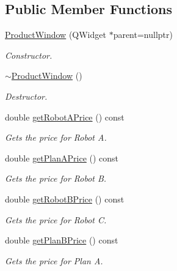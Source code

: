 \subsection*{Public Member Functions}
\begin{DoxyCompactItemize}
\item 
\mbox{\label{class_product_window_adafa731eb2e3c47c30f7a740a3a12576}} 
\mbox{\hyperlink{class_product_window_adafa731eb2e3c47c30f7a740a3a12576}{Product\+Window}} (Q\+Widget $\ast$parent=nullptr)
\begin{DoxyCompactList}\small\item\em Constructor. \end{DoxyCompactList}\item 
\mbox{\label{class_product_window_ae113591d990345573cbcf9faf790a7cc}} 
\mbox{\hyperlink{class_product_window_ae113591d990345573cbcf9faf790a7cc}{$\sim$\+Product\+Window}} ()
\begin{DoxyCompactList}\small\item\em Destructor. \end{DoxyCompactList}\item 
double \mbox{\hyperlink{class_product_window_a2256cbdf9844bb57ac003fcb719cabbb}{get\+Robot\+A\+Price}} () const
\begin{DoxyCompactList}\small\item\em Gets the price for Robot A. \end{DoxyCompactList}\item 
double \mbox{\hyperlink{class_product_window_afdeb02aa3514967090ef6d70b5407e0b}{get\+Plan\+A\+Price}} () const
\begin{DoxyCompactList}\small\item\em Gets the price for Robot B. \end{DoxyCompactList}\item 
double \mbox{\hyperlink{class_product_window_a4017b51e048ec4e725af49dc0dfb5c2b}{get\+Robot\+B\+Price}} () const
\begin{DoxyCompactList}\small\item\em Gets the price for Robot C. \end{DoxyCompactList}\item 
double \mbox{\hyperlink{class_product_window_a689a1bac6a244deffa68721fd8010835}{get\+Plan\+B\+Price}} () const
\begin{DoxyCompactList}\small\item\em Gets the price for Plan A. \end{DoxyCompactList}\item 

\end{DoxyCompactItemize}
